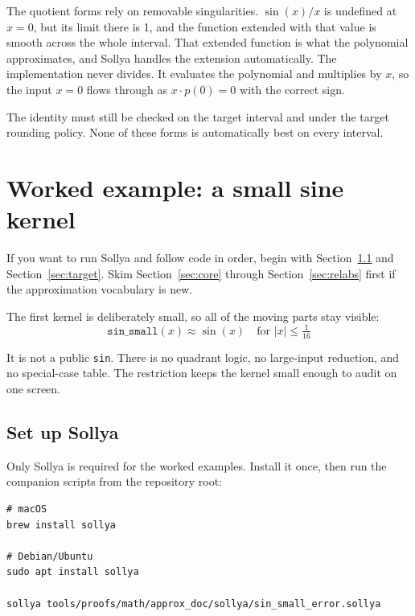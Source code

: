 \documentclass[manuscript, nonacm]{acmart}
\begin{document}
  The quotient forms rely on removable singularities.  $\sin(x)/x$ is undefined
  at $x = 0$, but its limit there is 1, and the function extended with that value
  is smooth across the whole interval. That extended function is what the
  polynomial approximates, and Sollya handles the extension automatically. The
  implementation never divides. It evaluates the polynomial and multiplies by
  $x$, so the input $x = 0$ flows through as $x \cdot p(0) = 0$ with the correct
  sign.

  The identity must still be checked on the target interval and under the
  target rounding policy. None of these forms is automatically best on every
  interval.



  \section{Worked example: a small sine kernel}

  \begin{tcolorbox}[colback=blue!5, colframe=blue!30, title={Start here for hands-on work}]
    If you want to run Sollya and follow code in order, begin with
    Section~\ref{sec:setup} and Section~\ref{sec:target}.
    Skim Section~\ref{sec:core} through Section~\ref{sec:relabs} first if the
    approximation vocabulary is new.
  \end{tcolorbox}

  The first kernel is deliberately small, so all of the moving parts stay visible:
  \[
    \texttt{sin\_small}(x) \approx \sin(x) \quad \text{for } |x| \le \tfrac{1}{16}
  \]

  It is not a public \texttt{sin}. There is no quadrant logic, no large-input
  reduction, and no special-case table. The restriction keeps the kernel small
  enough to audit on one screen.

  \subsection{Set up Sollya}
  \label{sec:setup}

  Only Sollya is required for the worked examples. Install it once, then run
  the companion scripts from the repository root:

  \begin{lstlisting}[style=shell]
# macOS
brew install sollya

# Debian/Ubuntu
sudo apt install sollya

sollya tools/proofs/math/approx_doc/sollya/sin_small_error.sollya
  \end{lstlisting}
\end{document}
